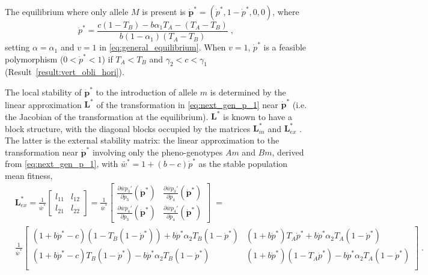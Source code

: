 \documentclass[12pt]{extarticle}
\let\vec\mathbf
\newcommand{\cl}{\mathbf{L}}
\begin{document}
\begin{appendices}
The equilibrium where only allele $M$ is present is  $\vec{\dot{p}^*} = (\dot{p}^*, 1-\dot{p}^*, 0, 0)$, where
\begin{equation} \label{eq:p_tilde_star_alpha_1}
\dot{p}^*=
\frac{c(1-T_B) - b \alpha_1 T_A - (T_A - T_B)}{b(1-\alpha_1)(T_A-T_B)} \;,
\end{equation}
setting $\alpha=\alpha_1$ and $v=1$ in \autoref{eq:general_equilibrium}.
When $v=1$, $\dot p^*$ is a feasible polymorphism ($0 < \dot{p}^* < 1$) if $T_A<T_B$ and $\gamma_2<c<\gamma_1$ (Result~\ref{result:vert_obli_hori}).

The local stability of $\vec{\dot{p}^*}$ to the introduction of allele $m$ is determined by the linear approximation $\cl^*$ of the transformation in \autoref{eq:next_gen_p_1} near $\vec{\dot{p}^*}$ (i.e. the Jacobian of the transformation at the equilibrium).
$\cl^*$ is known to have a block structure, with the diagonal blocks occupied by the matrices $\cl^*_{in}$ and $\cl^*_{ex}$ \citep{Liberman1986modifiers,Altenberg2017} .
The latter is the external stability matrix: the linear approximation to the transformation near $\vec{\dot{p}^*}$ involving only the pheno-genotypes $Am$ and $Bm$, derived from \autoref{eq:next_gen_p_1}, with $\bar{w}^*=1+(b-c)\dot{p}^*$ as the stable population mean fitness,
\begin{equation} \label{eq:external_stability_matrix}
\begin{aligned}
&\cl^*_{ex} = 
 \frac{1}{\bar{w}^*} \begin{bmatrix}
	 l_{1 1} &
	 l_{1 2} \\
	 l_{2 1} &
	 l_{2 2} 
\end{bmatrix} = 
\frac{1}{\bar{w}^*} \begin{bmatrix}
\frac{\partial\bar{w}\dot{p}_3'}{\partial \dot{p}_3}(\vec{\dot{p}}^*) &
\frac{\partial\bar{w}\dot{p}_3'}{\partial \dot{p}_4}(\vec{\dot{p}}^*) \\
\frac{\partial\bar{w}\dot{p}_4'}{\partial \dot{p}_3}(\vec{\dot{p}}^*) &
\frac{\partial\bar{w}\dot{p}_4'}{\partial \dot{p}_4}(\vec{\dot{p}}^*) 
\end{bmatrix} \;= \\
& \frac{1}{\bar{w}^*} \begin{bmatrix}
		(1+b \dot{p}^* -c)(1-T_B(1-\dot{p}^*)) + b \dot{p}^* \alpha_2 T_B (1-\dot{p}^*) & 
		(1+b \dot{p}^*) T_A \dot{p}^* + b \dot{p}^* \alpha_2 T_A(1-\dot{p}^*) \\
		(1+b \dot{p}^* - c) T_B(1-\dot{p}^*) - b \dot{p}^* \alpha_2 T_B (1-\dot{p}^*) &
		(1+b \dot{p}^*) (1-T_A \dot{p}^*) - b \dot{p}^* \alpha_2 T_A (1-\dot{p}^*) \\
  	\end{bmatrix} \;.
\end{aligned}
\end{equation}


\end{appendices}
\end{document}

